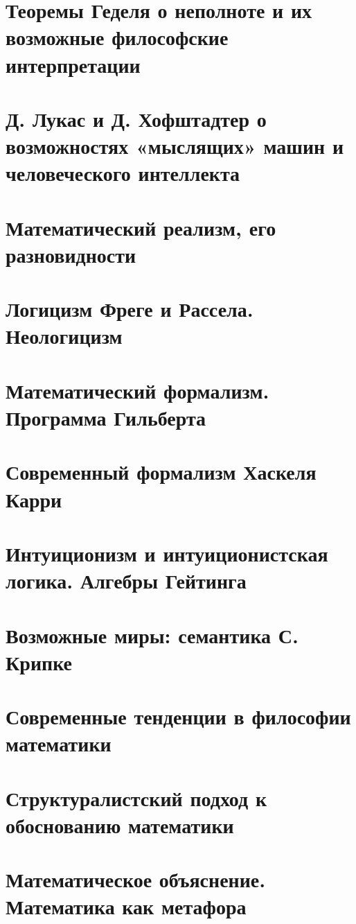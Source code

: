 \documentclass[12pt, specialist, subf, substylefile = spbu.rtx]{disser}
\begin{document}
\section{Теоремы Геделя о неполноте и их возможные философские интерпретации}
\section{Д. Лукас и Д. Хофштадтер о возможностях «мыслящих» машин и человеческого интеллекта}
\section{Математический реализм, его разновидности}
\section{Логицизм Фреге и Рассела. Неологицизм}
\section{Математический формализм. Программа Гильберта}
\section{Современный формализм Хаскеля Карри}
\section{Интуиционизм и интуиционистская логика. Алгебры Гейтинга}
\section{Возможные миры: семантика С. Крипке}
\section{Современные тенденции в философии математики}
\section{Структуралистский подход к обоснованию математики}
\section{Математическое объяснение. Математика как метафора}
\end{document}
